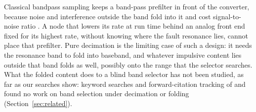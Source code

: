 Classical bandpass sampling keeps a band-pass prefilter in front of the converter, because noise
and interference outside the band fold into it and cost signal-to-noise ratio
\citep{vaughan1991,davenport2012noisefolding}. A node that lowers its rate at run time behind an
analog front end fixed for its highest rate, without knowing where the fault resonance lies,
cannot place that prefilter. Pure decimation is the limiting case of such a design: it needs the
resonance band to fold into baseband, and whatever impulsive content lies outside that band folds
as well, possibly onto the range that the selector searches. What the folded content does to a
blind band selector has not been studied, as far as our searches show: keyword searches and
forward-citation tracking of \citet{smith2016emi} and \citet{vaerenberg2025cyclicemi} found no work
on band selection under decimation or folding (Section~\ref{sec:related}).


